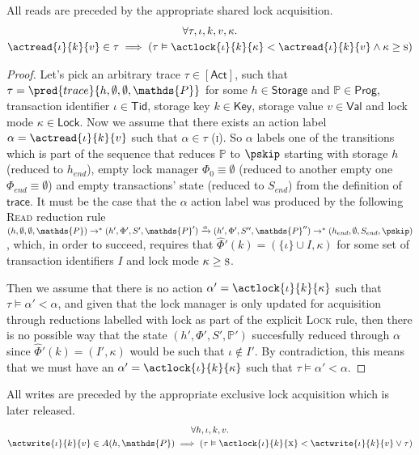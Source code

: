 \lem \label{lem:read} All reads are preceded by the appropriate shared lock acquisition.
\begin{gather*}
\forall \tau, \iota, k, v, \kappa \ldotp \\
\actread{\iota}{k}{v} \in \tau \implies \left( \tau \vDash \actlock{\iota}{k}{\kappa} < \actread{\iota}{k}{v} \land \kappa \geq \textsc{s} \right)
\end{gather*}

\begin{proof}
Let's pick an arbitrary trace $\tau \in \mathsf{[Act]}$, such that $\tau = \pred{trace}{h, \emptyset, \emptyset, \mathds{P}}$ for some $h \in \mathsf{Storage}$ and $\mathds{P} \in \mathsf{Prog}$, transaction identifier $\iota \in \mathsf{Tid}$, storage key $k \in \mathsf{Key}$, storage value $v \in \mathsf{Val}$ and lock mode $\kappa \in \mathsf{Lock}$. Now we assume that there exists an action label $\alpha = \actread{\iota}{k}{v}$ such that $\alpha \in \tau$ (\textsc{i}). So $\alpha$ labels one of the transitions which is part of the sequence that reduces $\mathds{P}$ to $\pskip$ starting with storage $h$ (reduced to $h_{end}$), empty lock manager $\Phi_0 \equiv \emptyset$ (reduced to another empty one $\Phi_{end} \equiv \emptyset$) and empty transactions' state (reduced to $S_{end}$) from the definition of $\mathsf{trace}$. It must be the case that the $\alpha$ action label was produced by the following \textsc{Read} reduction rule $(h, \emptyset, \emptyset, \mathds{P}) \rightarrow^* (h', \Phi', S', \mathds{P}') \xrightarrow{\alpha} (h', \Phi', S'', \mathds{P}'') \rightarrow^* (h_{end}, \emptyset, S_{end}, \pskip)$, which, in order to succeed, requires that $\hat{\Phi}'(k) = (\{ \iota \} \cup I, \kappa)$ for some set of transaction identifiers $I$ and lock mode $\kappa \geq \textsc{s}$.

Then we assume that there is no action $\alpha' = \actlock{\iota}{k}{\kappa}$ such that $\tau \vDash \alpha' < \alpha$, and given that the lock manager is only updated for acquisition through reductions labelled with \textsf{lock} as part of the explicit \textsc{Lock} rule, then there is no possible way that the state $(h', \Phi', S', \mathds{P}')$ succesfully reduced through $\alpha$ since $\hat{\Phi}'(k) = (I'
, \kappa)$ would be such that $\iota \not\in I'$. By contradiction, this means that we must have an $\alpha' = \actlock{\iota}{k}{\kappa}$ such that $\tau \vDash \alpha' < \alpha$.
\end{proof}

\lem \label{lem:write} All writes are preceded by the appropriate exclusive lock acquisition which is later released.
\begin{gather*}
\forall h, \iota, k, v \ldotp \\
\actwrite{\iota}{k}{v} \in A(h, \mathds{P}) \implies \left( \tau \vDash \actlock{\iota}{k}{\textsc{x}} < \actwrite{\iota}{k}{v} \lor \tau \right)
\end{gather*}

